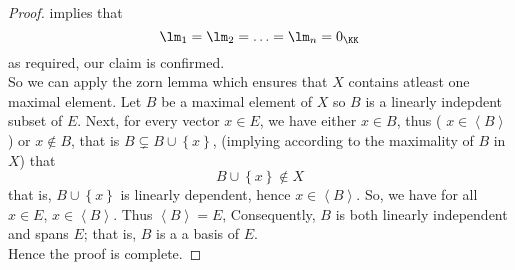 \begin{proof}
		implies that 
		\[
		\lm_1 = \lm_2 = \hdots = \lm_n = 0_{\KK}
		\]
		as required, our claim is confirmed. \\
		So we can apply the zorn lemma which ensures 
		that $X $ contains atleast one maximal element. 
		Let $B $ be a maximal element of $X $ so 
		$B $ is a linearly indepdent subset 
		of $E $. Next, for every 
		vector $x \in E $, we have either $x \in  B $, 
		thus ( $x \in \left\langle B \right\rangle  $) or 
		$x \notin B $, that is 
		$B \subsetneq  B \cup \left\{ x \right\}$, (implying
		according to the maximality of $B $ in $X $) that 
		\[
		B \cup \left\{ x \right\} \notin X
		\]
		that is,  
		$B \cup \left\{ x \right\} $  is linearly dependent, 
		hence $x \in  \left\langle B \right\rangle   $. 
		So, we have for all $x \in  E $, 
		$x \in  \left\langle B \right\rangle  $. Thus 
		$\left\langle B \right\rangle  = E$, Consequently, 
		$B $ is both linearly independent 
		and spans $E $; that is, $B $ is a a basis of 
		$E $. \\
		Hence the proof is complete.
	\end{proof}
